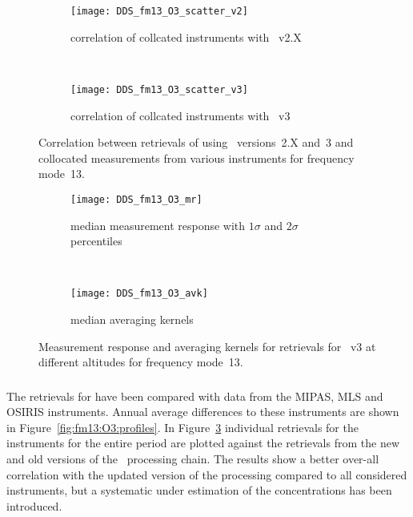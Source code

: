 \begin{figure}[htpb]
    \centering
    \begin{subfigure}[b]{0.49\textwidth}
        \texttt{[image: DDS\_fm13\_O3\_scatter\_v2]}
        \caption{correlation of collcated instruments with \smr~v2.X}
        \label{fig:fm13:O3:scatter:v2}
    \end{subfigure}
    \,
    \begin{subfigure}[b]{0.49\textwidth}
        \texttt{[image: DDS\_fm13\_O3\_scatter\_v3]}
        \caption{correlation of collcated instruments with \smr~v3}
        \label{fig:fm13:O3:scatter:v3}
    \end{subfigure}
    \caption{Correlation between retrievals of  using \smr\
    versions~2.X and~3 and collocated measurements from various instruments
    for frequency mode~13.}
    \label{fig:fm13:O3:scatter}
\end{figure}

\begin{figure}[htpb]
    \centering
    \begin{subfigure}[b]{0.49\textwidth}
        \texttt{[image: DDS\_fm13\_O3\_mr]}
        \caption{median measurement response with $1\sigma$ and $2\sigma$
        percentiles}
        \label{fig:fm13:O3:mr}
    \end{subfigure}
    \,
    \begin{subfigure}[b]{0.49\textwidth}
        \texttt{[image: DDS\_fm13\_O3\_avk]}
        \caption{median averaging kernels}
        \label{fig:fm13:O3:avk}
    \end{subfigure}
    \caption{Measurement response and averaging kernels for 
    retrievals for \smr~v3 at different altitudes for frequency mode~13.}
    \label{fig:fm13:O3:mr_avk}
\end{figure}

\subsubsection{}
\label{sec:fm13:comparison:O3}
The retrievals for \chem{O_3} have been compared with data from the MIPAS, MLS
and OSIRIS instruments. Annual average differences to these instruments are
shown in Figure~\ref{fig:fm13:O3:profiles}. In Figure~\ref{fig:fm13:O3:scatter}
individual retrievals for the instruments for the entire period are plotted
against the retrievals from the new and old versions of the \smr\ processing
chain. The results show a better over-all correlation with the updated version
of the processing compared to all considered instruments, but a systematic
under estimation of the concentrations has been introduced.


